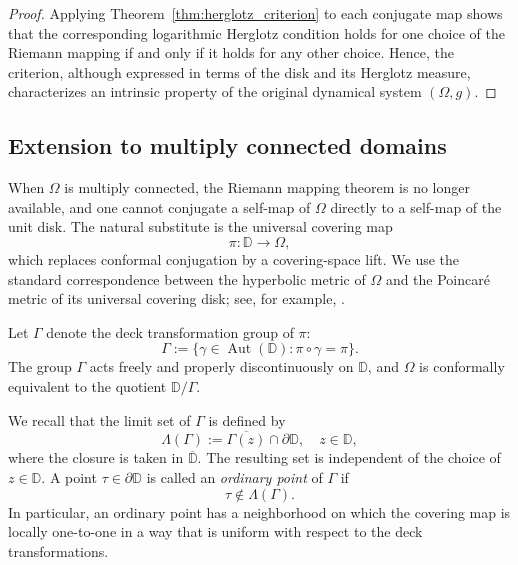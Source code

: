 \documentclass[12pt]{amsart}
\numberwithin{equation}{section}
\theoremstyle{plain}
\theoremstyle{definition}
\begin{document}
\begin{proof}
Applying Theorem~\ref{thm:herglotz_criterion} to each conjugate map
shows that the corresponding logarithmic Herglotz condition holds
for one choice of the Riemann mapping if and only if it holds for any
other choice. Hence, the criterion, although expressed in terms of the
disk and its Herglotz measure, characterizes an intrinsic property of
the original dynamical system $(\Omega,g)$.
\end{proof}


\subsection{Extension to multiply connected domains}
\label{subsec:multiply_connected}

When $\Omega$ is multiply connected, the Riemann mapping theorem is no
longer available, and one cannot conjugate a self-map of $\Omega$ directly
to a self-map of the unit disk. The natural substitute is the universal
covering map
\begin{equation*}
\pi:\mathbb D\to\Omega,
\end{equation*}
which replaces conformal conjugation by a covering-space lift. We use the
standard correspondence between the hyperbolic metric of $\Omega$ and the
Poincar\'e metric of its universal covering disk; see, for example,
\cite[Sections 1.6, 1.7, and 3.3]{Abate19}.

Let $\Gamma$ denote the deck transformation group of $\pi$:
\begin{equation*}
\label{eq:deck_group}
\Gamma
:=
\{\gamma\in\operatorname{Aut}(\mathbb D):
\pi\circ\gamma=\pi\}.
\end{equation*}
The group $\Gamma$ acts freely and properly discontinuously on $\mathbb D$,
and $\Omega$ is conformally equivalent to the quotient
$\mathbb D/\Gamma$.

We recall that the limit set of $\Gamma$ is defined by
\begin{equation*}
\label{eq:limit_set}
\Lambda(\Gamma)
:=
\overline{\Gamma(z)}\cap\partial\mathbb D,
\quad z\in\mathbb D,
\end{equation*}
where the closure is taken in $\overline{\mathbb D}$. The resulting set is
independent of the choice of $z\in\mathbb D$. A point
$\tau\in\partial\mathbb D$ is called an \emph{ordinary point} of $\Gamma$
if
\begin{equation*}
\tau\notin\Lambda(\Gamma).
\end{equation*}
In particular, an ordinary point has a neighborhood on which the covering
map is locally one-to-one in a way that is uniform with respect to the
deck transformations.
\end{document}
